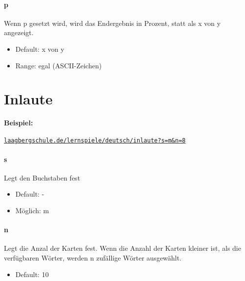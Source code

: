 \documentclass[]{article}
\begin{document}
\begin{multicols}{2}
	\paragraph{p}  Wenn p gesetzt wird, wird das Endergebnis in Prozent, statt als x von y angezeigt.
	\begin{itemize}
		\item Default:  x von y
		\item Range:  egal (ASCII-Zeichen)
	\end{itemize}

	\end{multicols}

\section{Inlaute}

\paragraph{Beispiel:}
\texttt{\href{laagbergschule.de/lernspiele/deutsch/inlaute?s=m\&n=8}{laagbergschule.de/lernspiele/deutsch/inlaute?s=m\&n=8}} \\
\begin{multicols}{2}

	\paragraph{s}  Legt den Buchstaben fest
	\begin{itemize}
		\item Default: -
		\item Möglich: m
	\end{itemize}

	\paragraph{n} Legt die Anzal der Karten fest. Wenn die Anzahl der Karten kleiner ist, als die verfügbaren Wörter, werden n zufällige Wörter ausgewählt.
	\begin{itemize}
		\item Default: 10
	\end{itemize}
\end{multicols}
\end{document}
